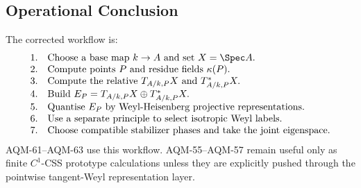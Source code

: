 \subsection{Operational Conclusion}

The corrected workflow is:
\[
\begin{array}{ll}
1. & \text{Choose a base map }k\to A\text{ and set }X=\Spec A.\\
2. & \text{Compute points }P\text{ and residue fields }\kappa(P).\\
3. & \text{Compute the relative }T_{A/k,P}X\text{ and }T^*_{A/k,P}X.\\
4. & \text{Build }E_P=T_{A/k,P}X\oplus T^*_{A/k,P}X.\\
5. & \text{Quantise }E_P\text{ by Weyl-Heisenberg projective representations}.\\
6. & \text{Use a separate principle to select isotropic Weyl labels}.\\
7. & \text{Choose compatible stabilizer phases and take the joint eigenspace}.
\end{array}
\]
AQM-61--AQM-63 use this workflow.  AQM-55--AQM-57 remain useful only as
finite \(C^1\)-CSS prototype calculations unless they are explicitly pushed
through the pointwise tangent-Weyl representation layer.
